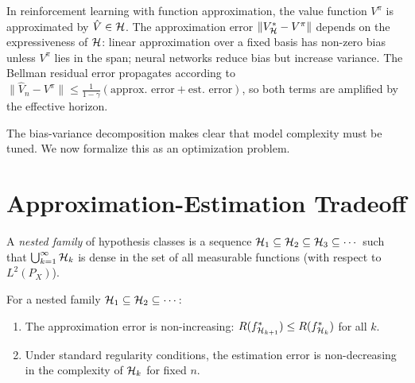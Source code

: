 \documentclass[11pt,a4paper]{article}
\begin{document}
\begin{rlconnection}[title={Bias-Variance in Value Function
    Approximation}]
In reinforcement learning with function approximation, the value
function $V^\pi$ is approximated by $\hat{V} \in \mathcal{H}$.  The
approximation error $\|V_{\mathcal{H}}^* - V^\pi\|$ depends on the
expressiveness of $\mathcal{H}$: linear approximation over a fixed
basis has non-zero bias unless $V^\pi$ lies in the span; neural
networks reduce bias but increase variance.  The Bellman residual
error propagates according to $\|\hat{V}_n - V^\pi\| \leq
\frac{1}{1 - \gamma}(\text{approx.\ error} + \text{est.\ error})$,
so both terms are amplified by the effective horizon.
\end{rlconnection}

The bias-variance decomposition makes clear that model complexity
must be tuned.  We now formalize this as an optimization problem.


\section{Approximation-Estimation Tradeoff}
\label{sec:approx_estimation}

\begin{definition}
\label{def:nested}
A \emph{nested family} of hypothesis classes is a sequence
$\mathcal{H}_1 \subseteq \mathcal{H}_2 \subseteq \mathcal{H}_3 \subseteq \cdots$
such that $\bigcup_{k=1}^\infty \mathcal{H}_k$ is dense in the set
of all measurable functions (with respect to $L^2(P_X)$).
\end{definition}

\begin{proposition}
\label{prop:monotonicity}
For a nested family $\mathcal{H}_1 \subseteq \mathcal{H}_2 \subseteq \cdots$:
\begin{enumerate}[nosep,label=(\roman*)]
    \item The approximation error is non-increasing:
    $R(f_{\mathcal{H}_{k+1}}^*) \leq R(f_{\mathcal{H}_k}^*)$ for
    all $k$.
    \item Under standard regularity conditions, the estimation error
    is non-decreasing in the complexity of $\mathcal{H}_k$ for fixed $n$.
\end{enumerate}
\end{proposition}
\end{document}
